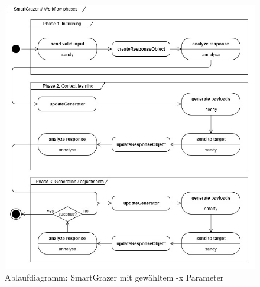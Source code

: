 \begin{figure}[htbp] 
	\centering
	\includegraphics[width=\textwidth]{contents/images/SmartGrazerWorkflowPhases}
	\caption{Ablaufdiagramm: SmartGrazer mit gewähltem -x Parameter}
	\label{fig:SmartGrazerWorkflowPhases}
\end{figure}